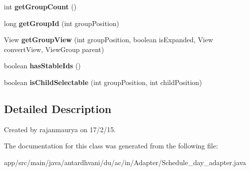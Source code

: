\begin{DoxyCompactItemize}
\item 
\hypertarget{classantardhvani_1_1du_1_1ac_1_1in_1_1_adapter_1_1_schedule__day__adapter_a62df28203a2570dadac50dbce760cece}{}int {\bfseries get\+Group\+Count} ()\label{classantardhvani_1_1du_1_1ac_1_1in_1_1_adapter_1_1_schedule__day__adapter_a62df28203a2570dadac50dbce760cece}

\item 
\hypertarget{classantardhvani_1_1du_1_1ac_1_1in_1_1_adapter_1_1_schedule__day__adapter_a32f65583036cc1aa8e9f8b7b185681da}{}long {\bfseries get\+Group\+Id} (int group\+Position)\label{classantardhvani_1_1du_1_1ac_1_1in_1_1_adapter_1_1_schedule__day__adapter_a32f65583036cc1aa8e9f8b7b185681da}

\item 
\hypertarget{classantardhvani_1_1du_1_1ac_1_1in_1_1_adapter_1_1_schedule__day__adapter_a82a80842e7215e8f8c729c5c9883feed}{}View {\bfseries get\+Group\+View} (int group\+Position, boolean is\+Expanded, View convert\+View, View\+Group parent)\label{classantardhvani_1_1du_1_1ac_1_1in_1_1_adapter_1_1_schedule__day__adapter_a82a80842e7215e8f8c729c5c9883feed}

\item 
\hypertarget{classantardhvani_1_1du_1_1ac_1_1in_1_1_adapter_1_1_schedule__day__adapter_a6123b291532b6ebc7be54a8672028a81}{}boolean {\bfseries has\+Stable\+Ids} ()\label{classantardhvani_1_1du_1_1ac_1_1in_1_1_adapter_1_1_schedule__day__adapter_a6123b291532b6ebc7be54a8672028a81}

\item 
\hypertarget{classantardhvani_1_1du_1_1ac_1_1in_1_1_adapter_1_1_schedule__day__adapter_a48ad46c2e10644b16031b2b2d444492f}{}boolean {\bfseries is\+Child\+Selectable} (int group\+Position, int child\+Position)\label{classantardhvani_1_1du_1_1ac_1_1in_1_1_adapter_1_1_schedule__day__adapter_a48ad46c2e10644b16031b2b2d444492f}

\end{DoxyCompactItemize}


\subsection{Detailed Description}
Created by rajanmaurya on 17/2/15. 

The documentation for this class was generated from the following file\+:\begin{DoxyCompactItemize}
\item 
app/src/main/java/antardhvani/du/ac/in/\+Adapter/Schedule\+\_\+day\+\_\+adapter.\+java\end{DoxyCompactItemize}
